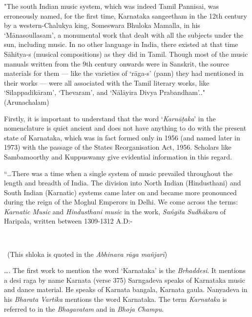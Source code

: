 \begin{myquote}
"The south Indian music system, which was indeed Tamil Pannisai, was erroneously named, for the first time, Karnataka sangeetham in the 12th century by a western-Chalukya king, Someswara Bhuloka Mamalla, in his ‘Mānasoullasam', a monumental work that dealt with all the subjects under the sun, including music. In no other language in India, there existed at that time Sāhitya-s (musical compositions) as they did in Tamil. Though most of the music manuals written from the 9th century onwards were in Sanskrit, the source materials for them — like the varieties of ‘rāga-s' (pann) they had mentioned in their works — were all associated with the Tamil literary works, like ‘Silappadikāram', ‘Thevaram', and ‘Nālāyira Divya Prabandham'.."\hfill (Arunachalam)
\end{myquote}

Firstly, it is important to understand that the word ‘\textit{Karnāṭaka}’ in the nomenclature is quiet ancient and does not have anything to do with the present state of Karnataka, which was in fact formed only in 1956 (and named later in 1973) with the passage of the States Reorganisation Act, 1956. Scholars like Sambamoorthy and Kuppuswamy give evidential information in this regard.

\begin{myquote}
“…There was a time when a single system of music prevailed throughout the length and breadth of India. The division into North Indian (Hindusthani) and South Indian (Karnatic) systems came later on and became more pronounced during the reign of the Moghul Emperors in Delhi. We come across the terms: \textit{Karnatic Music} and \textit{Hindusthani music} in the work, \textit{Sańgīta Sudhākara} of Haripala, written between 1309-1312 A.D:-
\end{myquote}

\begin{myquote}
\\

~\hfill (This shloka is quoted in the \textit{Abhinava rāga mañjarī})
\end{myquote}

\begin{myquote}
…. The first work to mention the word ‘Karnataka’ is the \textit{Brhaddesi}. It mentions a desi raga by name Karnata (verse 375) Sarngadeva speaks of Karnataka music and dance material. He speaks of Karnata bangala, Karnata gaula. Nanyadeva in his \textit{Bharata Vartika} mentions the word Karnataka. The term \textit{Karnataka} is referred to in the \textit{Bhagavatam} and in \textit{Bhoja Champu}.
\end{myquote}

